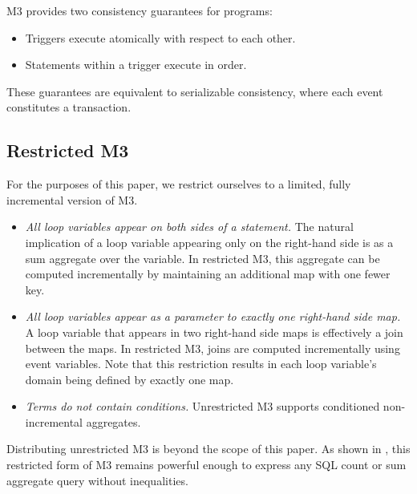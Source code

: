 \documentclass{vldb}
\begin{document}
M3 provides two consistency guarantees for programs:
\begin{itemize}
\item Triggers execute atomically with respect to each other.
\item Statements within a trigger execute in order.
\end{itemize}
These guarantees are equivalent to serializable consistency, where each event constitutes a transaction.


\subsection{Restricted M3}

For the purposes of this paper, we restrict ourselves to a limited, fully incremental version of M3.  
\begin{itemize}
\item \textit{All loop variables appear on both sides of a statement.}  The natural implication of a loop variable appearing only on the right-hand side is as a sum aggregate over the variable.  In restricted M3, this aggregate can be computed incrementally by maintaining an additional map with one fewer key.
\item \textit{All loop variables appear as a parameter to exactly one right-hand side map.}  A loop variable that appears in two right-hand side maps is effectively a join between the maps.  In restricted M3, joins are computed incrementally using event variables.  Note that this restriction results in each loop variable's domain being defined by exactly one map.
\item \textit{Terms do not contain conditions.}  Unrestricted M3 supports conditioned non-incremental aggregates.
\end{itemize}

Distributing unrestricted M3 is beyond the scope of this paper.  As shown in \cite{dbtoaster-pods}, this restricted form of M3 remains powerful enough to express any SQL count or sum aggregate query without inequalities.  
\end{document}

